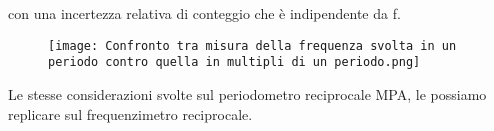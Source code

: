 con una incertezza relativa di conteggio che è indipendente da f. \newline 

\begin{figure}[h]
    \centering
    \texttt{[image: Confronto tra misura della frequenza svolta in un periodo contro quella in multipli di un periodo.png]}
\end{figure}

Le stesse considerazioni svolte sul periodometro reciprocale MPA, 
le possiamo replicare sul frequenzimetro reciprocale. \newline 

\newpage